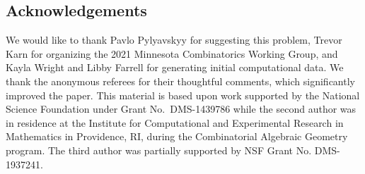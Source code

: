 \documentclass[pdftex]{sigma}
\numberwithin{equation}{section}
\begin{document}
\subsection*{Acknowledgements}
We would like to thank Pavlo Pylyavskyy for suggesting this problem, Trevor Karn for organizing the 2021 Minnesota Combinatorics Working Group, and Kayla Wright and Libby Farrell for generating initial computational data. We thank the anonymous referees for their thoughtful comments, which significantly improved the paper.
This material is based upon work supported by the National Science Foundation under Grant No.~DMS-1439786 while the second author was in residence at the Institute for Computational and Experimental Research in Mathematics in Providence, RI, during the Combinatorial Algebraic Geometry program. The third author was partially supported by NSF Grant No. DMS-1937241.
%
%
\end{document}
